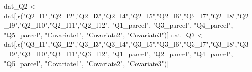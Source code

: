 \documentclass[
]{book}
\newenvironment{Shaded}{\begin{snugshade}}{\end{snugshade}}
\newcommand{\FunctionTok}[1]{\textcolor[rgb]{0.00,0.00,0.00}{#1}}
\newcommand{\NormalTok}[1]{#1}
\newcommand{\OtherTok}[1]{\textcolor[rgb]{0.56,0.35,0.01}{#1}}
\newcommand{\StringTok}[1]{\textcolor[rgb]{0.31,0.60,0.02}{#1}}
\begin{document}
\begin{Shaded}
\begin{Highlighting}[]
\NormalTok{dat\_Q2 }\OtherTok{\textless{}{-}}\NormalTok{ dat[,}\FunctionTok{c}\NormalTok{(}\StringTok{"Q2\_I1"}\NormalTok{,}\StringTok{"Q2\_I2"}\NormalTok{,}\StringTok{"Q2\_I3"}\NormalTok{,}\StringTok{"Q2\_I4"}\NormalTok{,}\StringTok{"Q2\_I5"}\NormalTok{,}\StringTok{"Q2\_I6"}\NormalTok{,}\StringTok{"Q2\_I7"}\NormalTok{,}\StringTok{"Q2\_I8"}\NormalTok{,}\StringTok{"Q2\_I9"}\NormalTok{,}\StringTok{"Q2\_I10"}\NormalTok{,}\StringTok{"Q2\_I11"}\NormalTok{,}\StringTok{"Q2\_I12"}\NormalTok{, }
                    \StringTok{"Q1\_parcel"}\NormalTok{, }\StringTok{"Q3\_parcel"}\NormalTok{, }\StringTok{"Q4\_parcel"}\NormalTok{, }\StringTok{"Q5\_parcel"}\NormalTok{,}
                    \StringTok{"Covariate1"}\NormalTok{, }\StringTok{"Covariate2"}\NormalTok{, }\StringTok{"Covariate3"}\NormalTok{)]}
\NormalTok{dat\_Q3 }\OtherTok{\textless{}{-}}\NormalTok{ dat[,}\FunctionTok{c}\NormalTok{(}\StringTok{"Q3\_I1"}\NormalTok{,}\StringTok{"Q3\_I2"}\NormalTok{,}\StringTok{"Q3\_I3"}\NormalTok{,}\StringTok{"Q3\_I4"}\NormalTok{,}\StringTok{"Q3\_I5"}\NormalTok{,}\StringTok{"Q3\_I6"}\NormalTok{,}\StringTok{"Q3\_I7"}\NormalTok{,}\StringTok{"Q3\_I8"}\NormalTok{,}\StringTok{"Q3\_I9"}\NormalTok{,}\StringTok{"Q3\_I10"}\NormalTok{,}\StringTok{"Q3\_I11"}\NormalTok{,}\StringTok{"Q3\_I12"}\NormalTok{, }
                    \StringTok{"Q1\_parcel"}\NormalTok{, }\StringTok{"Q2\_parcel"}\NormalTok{, }\StringTok{"Q4\_parcel"}\NormalTok{, }\StringTok{"Q5\_parcel"}\NormalTok{,}
                    \StringTok{"Covariate1"}\NormalTok{, }\StringTok{"Covariate2"}\NormalTok{, }\StringTok{"Covariate3"}\NormalTok{)]}


\end{Highlighting}
\end{Shaded}
\end{document}
